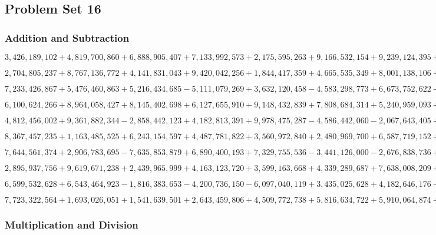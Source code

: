 \hypertarget{problem-set-16-6}{%
\subsection{Problem Set 16}\label{problem-set-16-6}}

\hypertarget{addition-and-subtraction-396}{%
\subsubsection{Addition and
Subtraction}\label{addition-and-subtraction-396}}

\(3,426,189,102+4,819,700,860+6,888,905,407+7,133,992,573+2,175,595,263+9,166,532,154+9,239,124,395+6,760,961,180+8,802,920,049+9,274,757,251\)

\(2,704,805,237+8,767,136,772+4,141,831,043+9,420,042,256+1,844,417,359+4,665,535,349+8,001,138,106+2,852,133,066+8,289,022,870+9,735,114,854\)

\(7,233,426,867+5,476,460,863+5,216,434,685-5,111,079,269+3,632,120,458-4,583,298,773+6,673,752,622-9,393,509,706-5,948,824,363+8,683,429,117\)

\(6,100,624,266+8,964,058,427+8,145,402,698+6,127,655,910+9,148,432,839+7,808,684,314+5,240,959,093+7,116,749,645+1,087,370,783+2,003,994,326\)

\(4,812,456,002+9,361,882,344-2,858,442,123+4,182,813,391+9,978,475,287-4,586,442,060-2,067,643,405+3,748,219,532-3,576,363,119+1,733,715,010\)

\(8,367,457,235+1,163,485,525+6,243,154,597+4,487,781,822+3,560,972,840+2,480,969,700+6,587,719,152+4,716,436,904+5,814,714,939+3,387,468,933\)

\(7,644,561,374+2,906,783,695-7,635,853,879+6,890,400,193+7,329,755,536-3,441,126,000-2,676,838,736+2,266,751,332-4,653,706,797+1,859,724,796\)

\(2,895,937,756+9,619,671,238+2,439,965,999+4,163,123,720+3,599,163,668+4,339,289,687+7,638,008,209+5,561,343,754+4,940,206,902+6,090,707,190\)

\(6,599,532,628+6,543,464,923-1,816,383,653-4,200,736,150-6,097,040,119+3,435,025,628+4,182,646,176-8,633,560,857+8,973,182,729+8,602,669,327\)

\(7,723,322,564+1,693,026,051+1,541,639,501+2,643,459,806+4,509,772,738+5,816,634,722+5,910,064,874+4,927,231,272+8,122,488,582+8,935,905,850\)

\hypertarget{multiplication-and-division-394}{%
\subsubsection{Multiplication and
Division}\label{multiplication-and-division-394}}

